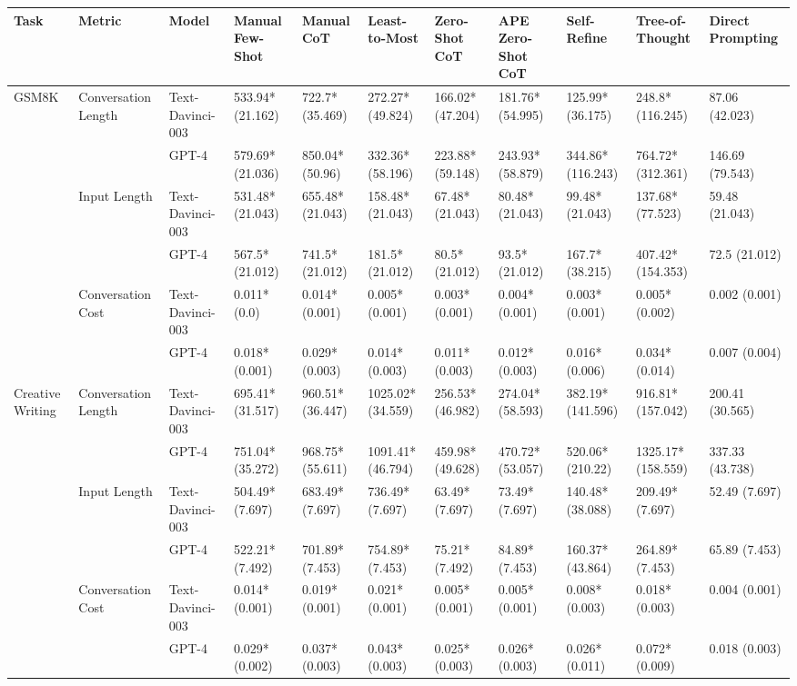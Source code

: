 \begin{tabular}{x{0.75cm}|x{1.5cm}|x{0.75cm}|x{0.75cm}|x{0.75cm}|x{0.75cm}|x{0.75cm}|x{0.75cm}|x{0.75cm}|x{0.75cm}|x{0.75cm}}
\toprule
\hline
Task & Metric & Model & Manual Few-Shot & Manual CoT & Least-to-Most & Zero-Shot CoT & APE Zero-Shot CoT & Self-Refine & Tree-of-Thought & Direct Prompting \\
\hline
\midrule
GSM8K & Conversation Length & Text-Davinci-003 & 533.94* (21.162) & 722.7* (35.469) & 272.27* (49.824) & 166.02* (47.204) & 181.76* (54.995) & 125.99* (36.175) & 248.8* (116.245) & 87.06 (42.023) \\
\hline
 &  & GPT-4 & 579.69* (21.036) & 850.04* (50.96) & 332.36* (58.196) & 223.88* (59.148) & 243.93* (58.879) & 344.86* (116.243) & 764.72* (312.361) & 146.69 (79.543) \\
\hline
 & Input Length & Text-Davinci-003 & 531.48* (21.043) & 655.48* (21.043) & 158.48* (21.043) & 67.48* (21.043) & 80.48* (21.043) & 99.48* (21.043) & 137.68* (77.523) & 59.48 (21.043) \\
\hline
 &  & GPT-4 & 567.5* (21.012) & 741.5* (21.012) & 181.5* (21.012) & 80.5* (21.012) & 93.5* (21.012) & 167.7* (38.215) & 407.42* (154.353) & 72.5 (21.012) \\
\hline
 & Conversation Cost & Text-Davinci-003 & 0.011* (0.0) & 0.014* (0.001) & 0.005* (0.001) & 0.003* (0.001) & 0.004* (0.001) & 0.003* (0.001) & 0.005* (0.002) & 0.002 (0.001) \\
\hline
 &  & GPT-4 & 0.018* (0.001) & 0.029* (0.003) & 0.014* (0.003) & 0.011* (0.003) & 0.012* (0.003) & 0.016* (0.006) & 0.034* (0.014) & 0.007 (0.004) \\
\hline
Creative Writing & Conversation Length & Text-Davinci-003 & 695.41* (31.517) & 960.51* (36.447) & 1025.02* (34.559) & 256.53* (46.982) & 274.04* (58.593) & 382.19* (141.596) & 916.81* (157.042) & 200.41 (30.565) \\
\hline
 &  & GPT-4 & 751.04* (35.272) & 968.75* (55.611) & 1091.41* (46.794) & 459.98* (49.628) & 470.72* (53.057) & 520.06* (210.22) & 1325.17* (158.559) & 337.33 (43.738) \\
\hline
 & Input Length & Text-Davinci-003 & 504.49* (7.697) & 683.49* (7.697) & 736.49* (7.697) & 63.49* (7.697) & 73.49* (7.697) & 140.48* (38.088) & 209.49* (7.697) & 52.49 (7.697) \\
\hline
 &  & GPT-4 & 522.21* (7.492) & 701.89* (7.453) & 754.89* (7.453) & 75.21* (7.492) & 84.89* (7.453) & 160.37* (43.864) & 264.89* (7.453) & 65.89 (7.453) \\
\hline
 & Conversation Cost & Text-Davinci-003 & 0.014* (0.001) & 0.019* (0.001) & 0.021* (0.001) & 0.005* (0.001) & 0.005* (0.001) & 0.008* (0.003) & 0.018* (0.003) & 0.004 (0.001) \\
\hline
 &  & GPT-4 & 0.029* (0.002) & 0.037* (0.003) & 0.043* (0.003) & 0.025* (0.003) & 0.026* (0.003) & 0.026* (0.011) & 0.072* (0.009) & 0.018 (0.003) \\
\hline
\bottomrule
\end{tabular}
